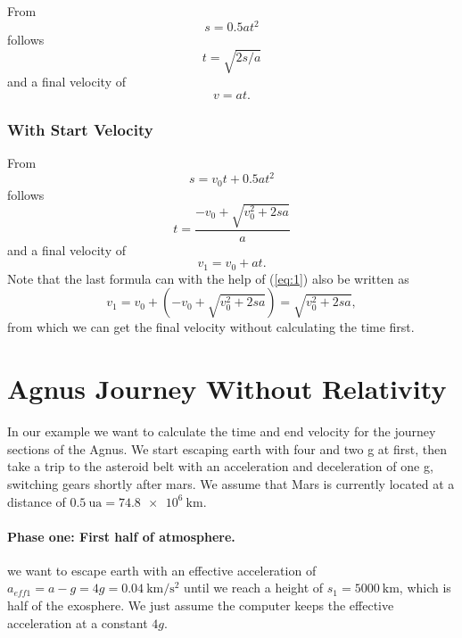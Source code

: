 \documentclass[10pt]{article}
\numberwithin{equation}{section}
\begin{document}
	From	
	\begin{equation}
		s = 0.5at^2	\end{equation}
	follows	
	\begin{equation}
		t = \sqrt{2s/a}	\end{equation}	
	and a final velocity of	
	\begin{equation}
		v=at. \end{equation}
	
	\subsubsection{With Start Velocity}
	
	From	
	\begin{equation}
		s = v_0t + 0.5at^2 \end{equation}	
	follows	
	\begin{equation}\label{eq:1}
		t = \frac{-v_0 + \sqrt{v^2_0 + 2sa}}{a}	\end{equation}	
	and a final velocity of	
	\begin{equation}
		v_1 = v_0 + at.	\end{equation}	
	Note that the last formula can with the help of (\ref{eq:1}) also be written as	
	\begin{equation}
		v_1=v_0 + (-v_0 + \sqrt{v^2_0+2sa}) = \sqrt{v^2_0+2sa},	\end{equation}	
	from which we can get the final velocity without calculating the time first.
	
	\section{Agnus Journey Without Relativity}
	
	In our example we want to calculate the time and end velocity for the journey sections of the Agnus. We start escaping earth with four and two g at first, then take a trip to the asteroid belt with an acceleration and deceleration of one g, switching gears shortly after mars. We assume that Mars is currently located at a distance of $\SI{0.5}{\astronomicalunit} = \SI{74.8e+6}{\km}$.
	
	\paragraph{Phase one: First half of atmosphere.}
	we want to escape earth with an effective acceleration of $a_{eff1} = a-g = 4g = \SI{0.04}{\km\per\s\squared}$ until we reach a height of $s_1= \SI{5000}{\km}$, which is half of the exosphere. We just assume the computer keeps the effective acceleration at a constant $4g$.
	
\end{document}
